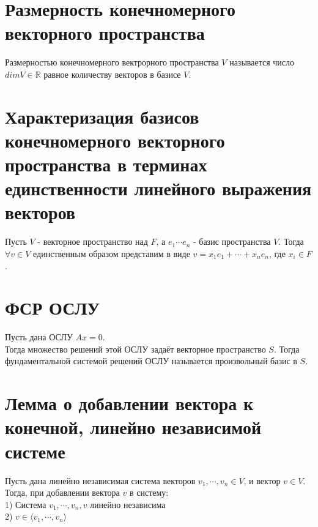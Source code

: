 \documentclass[a4paper,11pt]{report}
\begin{document}
\section{Размерность конечномерного векторного пространства}
Размерностью конечномерного вектрорного пространства $V$ называется число $dim V \in \mathbb{R}$ равное количеству
векторов в базисе $V$.
\section{Характеризация базисов конечномерного векторного пространства в терминах единственности линейного выражения
векторов}
Пусть $V$ - векторное пространство над $F$, а $e_1 \cdots e_n$ - базис пространства $V$. 
Тогда $\forall v \in V$ единственным образом представим в виде $v = x_1e_1 + \cdots + x_ne_n$, где $x_i \in F$.
\section{ФСР ОСЛУ}
Пусть дана ОСЛУ $Ax = 0$.\\
Тогда множество решений этой ОСЛУ задаёт векторное пространство $S$. 
Тогда фундаментальной системой решений ОСЛУ называется произвольный базис в $S$.
\section{Лемма о добавлении вектора к конечной, линейно независимой системе}
Пусть дана линейно независимая система векторов $v_1, \cdots, v_n \in V$, и вектор $v \in V$.\\
Тогда, при добавлении вектора $v$ в систему:\\
1) Система $v_1, \cdots, v_n, v$ линейно независима\\
2) $v \in \langle v_1, \cdots, v_n \rangle$
\end{document}
